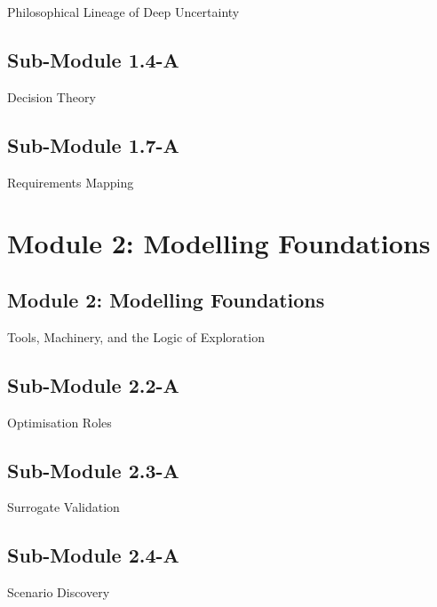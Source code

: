 \documentclass[
  11pt,
  a4paper,
  twoside,
  openright]{scrbook}
\begin{document}
Philosophical Lineage of Deep Uncertainty

\hfill\break

\chapter{Sub-Module 1.4-A}\label{sub-module-1.4-a}

Decision Theory

\hfill\break

\chapter{Sub-Module 1.7-A}\label{sub-module-1.7-a}

Requirements Mapping

\hfill\break

\part{Module 2: Modelling Foundations}

\chapter{Module 2: Modelling
Foundations}\label{module-2-modelling-foundations-1}

Tools, Machinery, and the Logic of Exploration

\hfill\break

\chapter{Sub-Module 2.2-A}\label{sub-module-2.2-a}

Optimisation Roles

\hfill\break

\chapter{Sub-Module 2.3-A}\label{sub-module-2.3-a}

Surrogate Validation

\hfill\break

\chapter{Sub-Module 2.4-A}\label{sub-module-2.4-a}

Scenario Discovery

\hfill\break
\end{document}
